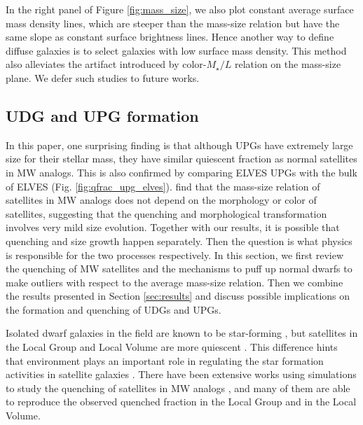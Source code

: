 \documentclass[twocolumn,astrosymb,twocolappendix]{aastex631}
\begin{document}
\begin{CJK*}{UTF8}{gbsn}
In the right panel of Figure \ref{fig:mass_size}, we also plot constant average surface mass density lines, which are steeper than the mass-size relation but have the same slope as constant surface brightness lines. Hence another way to define diffuse galaxies is to select galaxies with low surface mass density. This method also alleviates the artifact introduced by color-$M_\star/L$ relation on the mass-size plane. We defer such studies to future works.  


\subsection{UDG and UPG formation}
In this paper, one surprising finding is that although UPGs have extremely large size for their stellar mass, they have similar quiescent fraction as normal satellites in MW analogs. This is also confirmed by comparing ELVES UPGs with the bulk of ELVES (Fig. \ref{fig:qfrac_upg_elves}). \citet{ELVES-I} find that the mass-size relation of satellites in MW analogs does not depend on the morphology or color of satellites, suggesting that the quenching and morphological transformation involves very mild size evolution. Together with our results, it is possible that quenching and size growth happen separately. Then the question is what physics is responsible for the two processes respectively. In this section, we first review the quenching of MW satellites and the mechanisms to puff up normal dwarfs to make outliers with respect to the average mass-size relation. Then we combine the results presented in Section \ref{sec:results} and discuss possible implications on the formation and quenching of UDGs and UPGs. 

Isolated dwarf galaxies in the field are known to be star-forming \citep{Geha2012}, but satellites in the Local Group and Local Volume are more quiescent \citep{Grcevich2009,Spekkens2014,Wetzel2015,Putman2021,Baxter2021,CarlstenELVES2022,Karunakaran2022}. This difference hints that environment plays an important role in regulating the star formation activities in satellite galaxies \citep{Peng2010}. There have been extensive works using simulations to study the quenching of satellites in MW analogs \citep[e.g.,][]{Simpson2018,Buck2019,Garrison-Kimmel2019,Simons2020,Joshi2021,Akins2021,Karunakaran2021,Font2022,Samuel2022,Pan2022}, and many of them are able to reproduce the observed quenched fraction in the Local Group and in the Local Volume. 


\end{CJK*}
\end{document}
